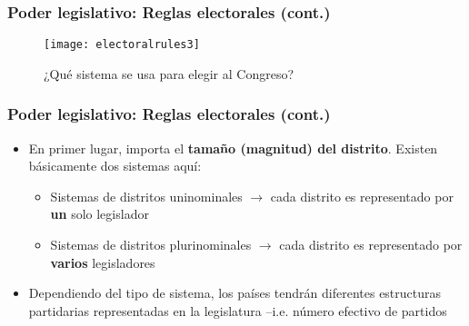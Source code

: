 \documentclass[14pt,aspectratio=169]{beamer}
\begin{document}
\begin{frame}\frametitle{Poder legislativo: Reglas electorales (cont.)}
 \begin{figure}[htbp]\vspace{0cm}
    \centering
    \texttt{[image: electoralrules3]}
    \caption{¿Qué sistema se usa para elegir al Congreso?}
    \label{fig:1}
  \end{figure}
        \end{frame}


    
    \begin{frame}\frametitle{Poder legislativo: Reglas electorales (cont.)}
    \begin{itemize}
    \item En primer lugar, importa el \textbf{tamaño (magnitud) del
        distrito}. Existen básicamente dos sistemas aquí:
      \begin{itemize}\itemsep 5pt
      \item Sistemas de distritos uninominales $\longrightarrow$ cada
        distrito es representado por \textbf{un} solo legislador
        \item Sistemas de distritos plurinominales $\longrightarrow$
          cada distrito es representado por \textbf{varios} legisladores
        \end{itemize}
        \item Dependiendo del tipo de sistema, los países tendrán
          diferentes estructuras partidarias representadas en la
          legislatura --i.e. número efectivo de partidos 
    \end{itemize}
    \end{frame}
        

\end{document}
